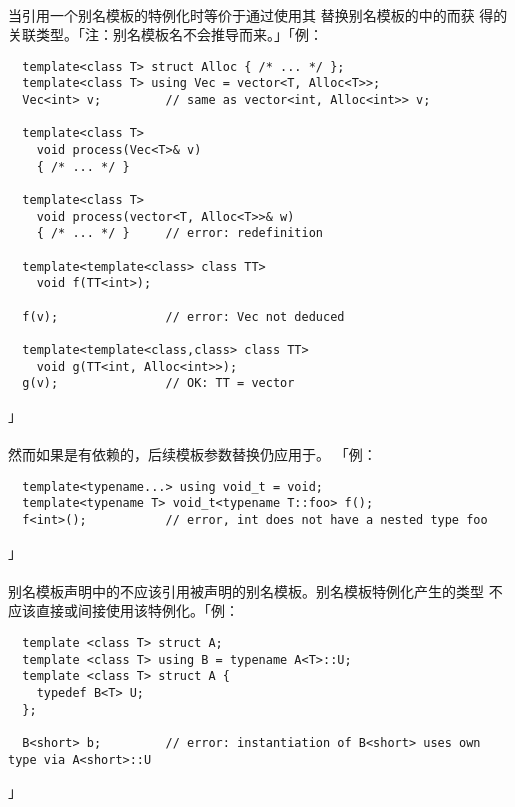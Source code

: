 \paragraph{}
当引用一个别名模板的特例化时等价于通过使用其
替换别名模板的中的而获
得的关联类型。「注：别名模板名不会推导而来。」「例：
\begin{lstlisting}
  template<class T> struct Alloc { /* ... */ };
  template<class T> using Vec = vector<T, Alloc<T>>;
  Vec<int> v;         // same as vector<int, Alloc<int>> v;

  template<class T>
    void process(Vec<T>& v)
    { /* ... */ }

  template<class T>
    void process(vector<T, Alloc<T>>& w)
    { /* ... */ }     // error: redefinition

  template<template<class> class TT>
    void f(TT<int>);

  f(v);               // error: Vec not deduced

  template<template<class,class> class TT>
    void g(TT<int, Alloc<int>>);
  g(v);               // OK: TT = vector
\end{lstlisting}」

\paragraph{}
然而如果是有依赖的，后续模板参数替换仍应用于。
「例：
\begin{lstlisting}
  template<typename...> using void_t = void;
  template<typename T> void_t<typename T::foo> f();
  f<int>();           // error, int does not have a nested type foo
\end{lstlisting}」

\paragraph{}
别名模板声明中的不应该引用被声明的别名模板。别名模板特例化产生的类型
不应该直接或间接使用该特例化。「例：
\begin{lstlisting}
  template <class T> struct A;
  template <class T> using B = typename A<T>::U;
  template <class T> struct A {
    typedef B<T> U;
  };

  B<short> b;         // error: instantiation of B<short> uses own type via A<short>::U
\end{lstlisting}」

